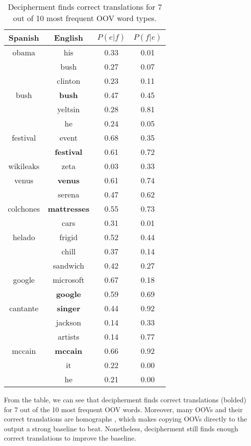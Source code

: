  \begin{table}
 \begin{center}
 \begin{tabular}{ |c|ccc|} \hline
Spanish & English & $P(e|f)$ & $P(f|e)$ \\ \hline
obama & his & 0.33 & 0.01 \\
           & bush & 0.27 & 0.07\\
           & clinton & 0.23 & 0.11 \\ \hline
bush & \textbf{bush} & 0.47 & 0.45 \\
        & yeltsin & 0.28 & 0.81 \\
        & he & 0.24 & 0.05 \\ \hline
festival & event & 0.68 & 0.35 \\
            &\textbf{festival} & 0.61 & 0.72 \\ \hline
wikileaks & zeta & 0.03 & 0.33 \\ \hline
venus & \textbf{venus} & 0.61 & 0.74 \\
          & serena & 0.47 & 0.62 \\ \hline
colchones & \textbf{mattresses} & 0.55 & 0.73 \\
                 & cars & 0.31 & 0.01 \\ \hline
helado & frigid & 0.52 & 0.44 \\
         & chill & 0.37 & 0.14 \\
           & sandwich & 0.42 & 0.27 \\ \hline
google & microsoft & 0.67 & 0.18 \\
            & \textbf{google} & 0.59 & 0.69 \\ \hline
cantante & \textbf{singer} & 0.44 & 0.92 \\
              & jackson & 0.14 & 0.33 \\
            & artists & 0.14 & 0.77 \\ \hline
mccain & \textbf{mccain} & 0.66 & 0.92 \\
            & it & 0.22 & 0.00 \\
            & he & 0.21 & 0.00 \\\hline
 \end{tabular}

 \caption{Decipherment finds correct translations for 7 out of 10 most frequent OOV word types.}
 \label{oov_translation}
 \end{center}
 \end{table}

From the table, we can see that decipherment finds correct translations (bolded) for 7 out of the 10 most frequent OOV words. Moreover, many OOVs and their correct translations are homographs , which makes copying OOVs directly to the output a strong baseline to beat. Nonetheless, decipherment still finds enough correct translations to improve the baseline.
